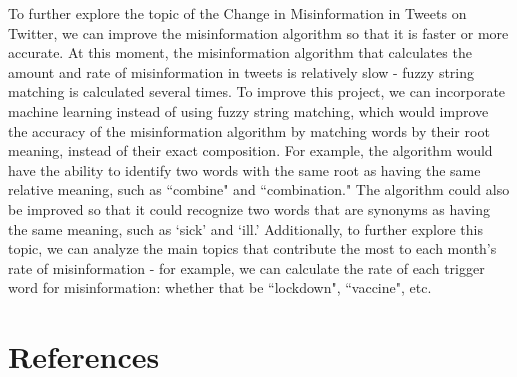 \documentclass[fontsize=11pt]{article}
\begin{document}
\begin{flushleft}
        To further explore the topic of the Change in Misinformation in Tweets on Twitter, we can improve the misinformation algorithm so that it is faster or more accurate. At this moment, the misinformation algorithm that calculates the amount and rate of misinformation in tweets is relatively slow - fuzzy string matching is calculated several times. To improve this project, we can incorporate machine learning instead of using fuzzy string matching, which would improve the accuracy of the misinformation algorithm by matching words by their root meaning, instead of their exact composition. For example, the algorithm would have the ability to identify two words with the same root as having the same relative meaning, such as ``combine" and ``combination." The algorithm could also be improved so that it could recognize two words that are synonyms as having the same meaning, such as `sick' and `ill.' Additionally, to further explore this topic, we can analyze the main topics that contribute the most to each month's rate of misinformation - for example, we can calculate the rate of each trigger word for misinformation: whether that be ``lockdown", ``vaccine", etc.

    \end{flushleft}

    \newpage

    \section*{References}
\end{document}

